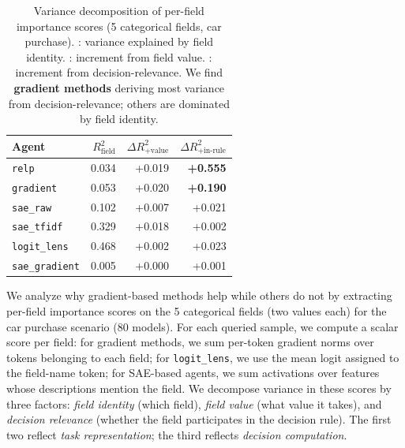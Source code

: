 \documentclass{article} %
\begin{document}
\begin{table}
  \vspace{-\intextsep}
  \centering
  \small
  \renewcommand{\arraystretch}{0.9}
  \begin{tabular}{@{}l rrr@{}}
    \toprule
    \textbf{Agent}
      & $R^2_\text{field}$
      & $\Delta R^2_\text{+value}$
      & $\Delta R^2_\text{+in-rule}$ \\
    \midrule
    \rowcolor{gradrow}
    \texttt{relp}
      & 0.034 & +0.019 & \textbf{+0.555} \\
    \rowcolor{gradrow}
    \texttt{gradient}
      & 0.053 & +0.020 & \textbf{+0.190} \\[3pt]
    \texttt{sae\_raw}
      & 0.102 & +0.007 & +0.021 \\
    \texttt{sae\_tfidf}
      & 0.329 & +0.018 & +0.002 \\
    \texttt{logit\_lens}
      & 0.468 & +0.002 & +0.023 \\
    \texttt{sae\_gradient}
      & 0.005 & +0.000 & +0.001 \\
    \bottomrule
  \end{tabular}
  \renewcommand{\arraystretch}{1.0}
  \vspace{-0.1in}
  \caption{Variance decomposition of per-field importance
    scores (5 categorical fields, car purchase).
    : variance explained by field identity.
    : increment from field value.
    : increment from
    decision-relevance. We find 
    {\setlength{\fboxsep}{1pt}\colorbox{gradrow}%
      {\textbf{gradient methods}}}
    deriving most variance from decision-relevance;
    others are dominated by field identity.}
  \label{tab:mechanistic}
  \vspace{-\intextsep}
\end{table}

We analyze why gradient-based methods help while others do not by extracting per-field importance scores on the 5 categorical fields (two values each) for the car purchase scenario (80 models).
For each queried sample, we compute a scalar score per field: for gradient methods, we sum per-token gradient norms over tokens belonging to each field; for \texttt{logit\_lens}, we use the mean logit assigned to the field-name token; for SAE-based agents, we sum activations over features whose descriptions mention the field. 
We decompose variance in these scores by three factors: \emph{field identity} (which field), \emph{field value} (what value it takes), and \emph{decision relevance} (whether the field participates in the decision rule).
The first two reflect \emph{task representation}; the third reflects \emph{decision computation}.
\end{document}
